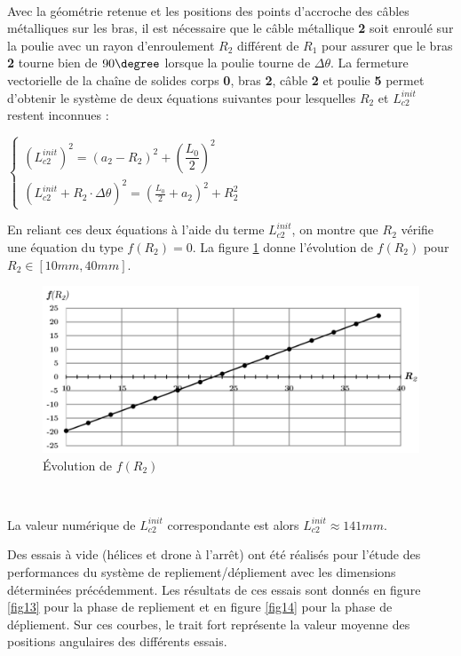 ~\

Avec la géométrie retenue et les positions des points d'accroche des câbles métalliques sur les bras, il est nécessaire que le câble métallique \textbf{2} soit enroulé sur la poulie avec un rayon d'enroulement $R_2$ différent de $R_1$ pour assurer que le bras \textbf{2} tourne bien de $90\degree$ lorsque la poulie tourne de $\Delta\theta$. La fermeture vectorielle de la chaîne de solides corps \textbf{0}, bras \textbf{2}, câble \textbf{2} et poulie \textbf{5} permet d'obtenir le système de deux équations suivantes pour lesquelles $R_2$ et $L_{c2}^{init}$ restent inconnues :

\begin{center}
$\left\{
\begin{array}{l}
\left(L_{c2}^{init}\right)^2=(a_2-R_2)^2+\left(\dfrac{L_0}{2}\right)^2\\
\left(L_{c2}^{init}+R_2\cdot\Delta\theta\right)^2=(\frac{L_0}{2}+a_2)^2+R_2^2
\end{array}
\right.$
\end{center}

En reliant ces deux équations à l'aide du terme $L_{c2}^{init}$, on montre que $R_2$ vérifie une équation du type $f(R_2)=0$. La figure \ref{fig12} donne l'évolution de $f(R_2)$ pour $R_2\in \left[10mm,40 mm\right]$.

\begin{figure}[ht!]
\begin{center}
 \includegraphics[width=0.75\linewidth]{img/fig12}
\end{center}
\caption{\label{fig12} Évolution de $f(R_2)$}
\end{figure}


~\

La valeur numérique de $L_{c2}^{init}$ correspondante est alors $L_{c2}^{init}\approx 141mm$.

Des essais à vide (hélices et drone à l'arrêt) ont été réalisés pour l'étude des performances du système de repliement/dépliement avec les dimensions déterminées précédemment. Les résultats de ces essais sont donnés en figure \ref{fig13} pour la phase de repliement et en figure \ref{fig14} pour la phase de dépliement. Sur ces courbes, le trait fort représente la valeur moyenne des positions angulaires des différents essais.

